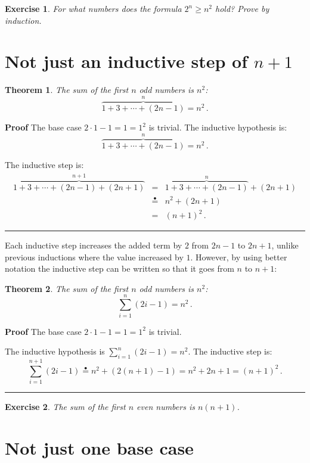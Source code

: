 \documentclass[11pt,a4paper]{report}
\newcommand*{\ih}{\stackrel{\bullet}{=}}
\newcommand*{\qed}{\hfill\rule{1ex}{1.5ex}}
\newcommand*{\qedd}[1]{\vspace*{-#1ex}\qed}
\newtheorem{theorem}{Theorem}
\newtheorem{exercise}{Exercise}
\begin{document}
\begin{exercise}
For what numbers does the formula $2^n\geq n^2$ hold? Prove by induction.
\end{exercise}

\section{Not just an inductive step of $n+1$}

\begin{theorem}
The sum of the first $n$ odd numbers is $n^2$:
\[
\overbrace{1 + 3 + \cdots + (2n-1)}^{n} = n^2\,.
\]
\end{theorem}

\textbf{Proof} The base case $2\cdot 1-1=1=1^2$ is trivial. The inductive hypothesis is:
\[
\overbrace{1 + 3 + \cdots + (2n-1)}^{n} = n^2\,.
\]

\newpage

The inductive step is:
\begin{eqnarray*}
\overbrace{1 + 3 + \cdots + (2n-1) + (2n+1)}^{n+1} &=& \overbrace{1 + 3 + \cdots + (2n-1)}^{n} + (2n+1)\\
&\ih{}& n^2 + (2n+1)\\
&=&(n+1)^2\,.
\end{eqnarray*}

\qedd{5}

Each inductive step increases the added term by $2$ from $2n-1$ to $2n+1$, unlike previous inductions where the value increased by $1$. However, by using better notation the inductive step can be written so that it goes from $n$ to $n+1$:

\begin{theorem}
The sum of the first $n$ odd numbers is $n^2$:
\[
\sum_{i=1}^n (2i-1) = n^2\,.
\]
\end{theorem}

\textbf{Proof} The base case $2\cdot 1-1=1=1^2$ 	is trivial.

The inductive hypothesis is $\sum_{i=1}^n (2i-1) = n^2$. The inductive step is:
\[
\sum_{i=1}^{n+1} (2i-1) \ih{} n^2 + (2(n+1)-1) = n^2 + 2n + 1 = (n+1)^2\,.
\]

\qedd{5}

\begin{exercise}
The sum of the first $n$ even numbers is $n(n+1)$.
\end{exercise}

\section{Not just one base case}
\end{document}
